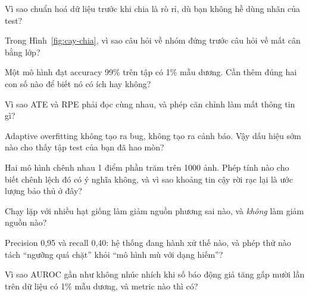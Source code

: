 \documentclass[../../deep_learning.tex]{subfiles}
\begin{document}
\begin{tukiem}
\item Vì sao chuẩn hoá dữ liệu trước khi chia là rò rỉ, dù bạn không hề dùng nhãn của test?
\item Trong Hình~\ref{fig:cay-chia}, vì sao câu hỏi về nhóm đứng trước câu hỏi về mất cân bằng lớp?
\item Một mô hình đạt accuracy 99\%
 trên tập có 1\%
mẫu dương. Cần thêm đúng hai con số nào để biết nó có ích hay không?
\item Vì sao ATE và RPE phải đọc cùng nhau, và phép căn chỉnh làm mất thông tin gì?
\item Adaptive overfitting không tạo ra bug, không tạo ra cảnh báo. Vậy dấu hiệu sớm nào cho thấy tập test của bạn đã hao mòn?
\item Hai mô hình chênh nhau 1 điểm phần trăm trên 1000 ảnh. Phép tính nào cho biết chênh lệch đó có ý nghĩa không, và vì sao khoảng tin cậy rời rạc lại là ước lượng bảo thủ ở đây?
\item Chạy lặp với nhiều hạt giống làm giảm nguồn phương sai nào, và \emph{không} làm giảm nguồn nào?
\item Precision 0{,}95 và recall 0{,}40: hệ thống đang hành xử thế nào, và phép thử nào tách ``ngưỡng quá chặt'' khỏi ``mô hình mù với dạng hiếm''?
\item Vì sao AUROC gần như không nhúc nhích khi số báo động giả tăng gấp mười lần trên dữ liệu có 1\% mẫu dương, và metric nào thì có?
\end{tukiem}
\ifSubfilesClassLoaded{\printbibliography[title={Nguồn}]}{}
\end{document}
